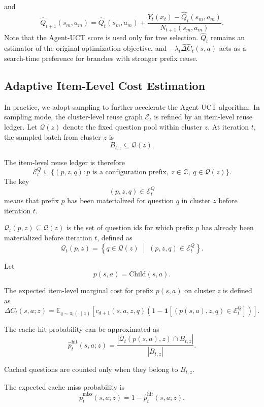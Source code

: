 \documentclass{article}
\begin{document}
and
\[
\hat Q_{t+1}(s_m,a_m)
=
\hat Q_t(s_m,a_m)
+
\frac{
Y_t(x_t)-\hat Q_t(s_m,a_m)
}{
N_{t+1}(s_m,a_m)
}.
\]
Note that the Agent-UCT score is used only for tree selection. \(\hat Q_t\) remains an estimator of the original
optimization objective, and
\(-\lambda_t\widehat{\Delta C}_t(s,a)\) acts as a search-time preference for
branches with stronger prefix reuse.





\subsection{Adaptive Item-Level Cost Estimation}

In practice, we adopt sampling to further accelerate the Agent-UCT algorithm.
In sampling mode, the cluster-level reuse graph \(\mathcal E_t\) is refined by
an item-level reuse ledger. 
Let \(\mathcal Q(z)\) denote the fixed question
pool within cluster \(z\). At iteration \(t\), the sampled batch from
cluster \(z\) is 
\[
B_{t,z}\subseteq\mathcal Q(z).
\]

The item-level reuse ledger is therefore
\[
\mathcal E_t^{Q}
\subseteq
\{(p,z,q): p \text{ is a configuration prefix},\ z\in\mathcal Z,\ q\in\mathcal Q(z)\}.
\]
The key
\[
(p,z,q)\in\mathcal E_t^{Q}
\]
means that prefix \(p\) has been materialized for question \(q\) in cluster
\(z\) before iteration \(t\).

\(\mathcal Q_t(p,z)\subseteq\mathcal Q(z)\) is the set of question ids for which prefix \(p\) has already been materialized before iteration \(t\), defined as
\[
\mathcal Q_t(p,z)
=
\left\{
q\in\mathcal Q(z)
\;\middle|\;
(p,z,q)\in\mathcal E_t^{Q}
\right\}.
\]


Let
\[
p(s,a)=\mathrm{Child}(s,a).
\]


The expected item-level marginal cost for prefix \(p(s,a)\) on cluster \(z\) is defined as
\[
\Delta C_t(s,a;z)
=
\mathbb{E}_{q \sim \pi_t(\cdot \mid z)}
\left[
c_{d+1}(s,a,z,q)
\left(
1 -
\mathbf{1}
\left[
(p(s,a),z,q) \in \mathcal E_t^Q
\right]
\right)
\right].
\]

The cache hit probability can be approximated as
\[
\hat p_t^{\mathrm{hit}}(s,a;z)
=
\frac{
\left|
\mathcal Q_t(p(s,a),z) \cap B_{t,z}
\right|
}{
|B_{t,z}|
}.
\]

Cached questions are counted only when they belong to \(B_{t,z}\).

The expected cache miss probability is
\[
\hat p_t^{\mathrm{miss}}(s,a;z)
=
1 - \hat p_t^{\mathrm{hit}}(s,a;z).
\]
\end{document}
